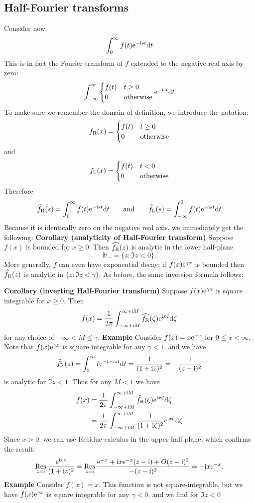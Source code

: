 \documentclass[12pt,landscape]{article}
\def\qqand{\qquad\hbox{and}\qquad}
\def\D{ {\rm d} }
\def\I{ {\rm i} }
\def\E{ {\rm e} }
\def\H{ {\mathbb H} }
\def\fR{ f_{\rm R} }
\def\fL{ f_{\rm L} }
\def\Res_#1{\underset{#1}{\rm Res}\,}
\def\dt{\D t}
\begin{document}
{\subsection{Half-Fourier transforms}
Consider now
\[
\int_0^\infty f(t) \E^{-\I s t} \dt
\]
This is in fact the Fourier transform of $f$ extended to the negative real axis by zero:
\[
\int_{-\infty}^\infty \begin{cases}f(t) & t \geq 0 \\ 0 & \hbox{otherwise} \end{cases} \E^{-\I s t} \dt
\]
To make sure we remember the domain of definition, we introduce the notation:
\[
f_{\rm R}(x) = \begin{cases}f(t) & t \geq 0 \\ 0 & \hbox{otherwise} \end{cases}
\]
and
\[
f_{\rm L}(x) = \begin{cases}f(t) & t < 0 \\ 0 & \hbox{otherwise} \end{cases}
\]
Therefore
\[
\widehat\fR(s) = \int_0^\infty f(t) \E^{-\I s t} \dt \qqand \widehat\fL(s) = \int_{-\infty}^0 f(t) \E^{-\I s t} \dt
\]
Because it is identically zero on the negative real axis, we immediately get the following:
\newpage
\textbf{Corollary (analyticity of Half-Fourier transform)}  Suppose $f(x)$ is bounded for $x \geq 0$. Then $\widehat{\fR}(z)$ is analytic in the lower half-plane
\[
\H_- = \{ z : \Im z < 0 \}.
\]
More generally, $f$ can even have exponential decay: if $f(x) \E^{\gamma x}$ is bounded then $\widehat\fR(z)$ is analytic in $\{z : \Im z < \gamma \}$.  As before, the same inversion formula follows:

\textbf{Corollary  (inverting Half-Fourier transform)}  Suppose  $f(x) \E^{\gamma x}$ is square integrable for $x \geq 0$. Then
\[
f(x) = {1 \over 2 \pi} \int_{-\infty + \I M}^{\infty + \I M} \widehat{\fR}(\zeta) \E^{\I x \zeta} \D \zeta
\]
for any choice of $-\infty < M \leq \gamma$.
\newpage
\textbf{Example} Consider $f(x)  = x \E^{-x}$ for $0 \leq x < \infty$.  Note that $f(x) \E^{\gamma x}$ is square integrable for any $\gamma < 1$, and we have
\[
\widehat\fR(z) = \int_0^\infty t \E^{-t -\I z t} \dt = {1 \over (1+\I z)^2} = -{1 \over (z - \I)^2} 
\]
is analytic for $\Im z < 1$. Thus for any $M < 1$ we have
\begin{align*}
f(x) &= {1 \over 2 \pi} \int_{-\infty+\I M}^{\infty +\I M}\widehat\fR(\zeta) \E^{\I x \zeta}\D \zeta \\
     &={1 \over 2 \pi} \int_{-\infty+\I M}^{\infty +\I M}{1 \over (1+\I \zeta)^2} \E^{\I x \zeta}\D \zeta
\end{align*}
Since $x > 0$, we can use Residue calculus in the upper-half plane, which confirms the result:
\[
\Res_{z = \I} {\E^{\I x z} \over  (1+\I z)^2}  = \Res_{z = \I} {\E^{- x} + \I x \E^{-x} (z - \I) + O(z-\I)^2 \over  -(z-\I)^2}  = -\I x \E^{-x}.
\]
\newpage
\textbf{Example} Consider $f(x) = x$.  This function is not square-integrable, but we have $f(x) \E^{\gamma x}$ is square integrable for any $\gamma < 0$, and we find for $\Im z < 0$

}
\end{document}
